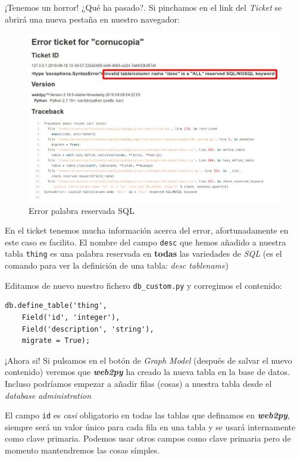 \documentclass[
  12pt,
  spanish,
]{article}
\begin{document}
¡Tenemos un horror! ¿Qué ha pasado?. Si pinchamos en el link del
\emph{Ticket} se abrirá una nueva pestaña en nuestro navegador:

\begin{figure}
\centering
\includegraphics{src/img/error_reserved_sql.jpg}
\caption{Error palabra reservada SQL}
\end{figure}

En el ticket tenemos mucha información acerca del error, afortunadamente
en este caso es facilito. El nombre del campo \texttt{desc} que hemos
añadido a nuestra tabla \texttt{thing} es una palabra reservada en
\textbf{todas} las variedades de \emph{SQL} (es el comando para ver la
definición de una tabla: \emph{desc tablename})

Editamos de nuevo nuestro fichero \texttt{db\_custom.py} y corregimos el
contenido:

\begin{verbatim}
db.define_table('thing',
    Field('id', 'integer'),
    Field('description', 'string'),
    migrate = True);
\end{verbatim}

¡Ahora si! Si pulsamos en el botón de \emph{Graph Model} (después de
salvar el nuevo contenido) veremos que \textbf{\emph{web2py}} ha creado
la nueva tabla en la base de datos. Incluso podríamos empezar a añadir
filas (cosas) a nuestra tabla desde el \emph{database administration}

El campo \texttt{id} es \emph{casi} obligatorio en todas las tablas que
definamos en \textbf{\emph{web2py}}, siempre será un valor único para
cada fila en una tabla y se usará internamente como clave primaria.
Podemos usar otros campos como clave primaria pero de momento
mantendremos las cosas símples.
\end{document}
